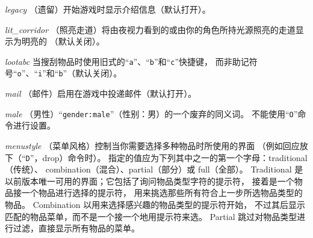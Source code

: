 \documentclass[a4paper, 10pt]{article}
\newcommand{\ib}[1]{\it #1 \hfill}
\begin{document}
\item[\ib{legacy}]
（遗留）开始游戏时显示介绍信息（默认打开）。
\item[\ib{lit\_corridor}]
（照亮走道）将由夜视力看到的或由你的角色所持光源照亮的走道显示为明亮的
（默认关闭）。
\item[\ib{lootabc}]
当搜刮物品时使用旧式的“{\tt a}”、“{\tt b}”和“{\tt c}”快捷键，
而非助记符号“{\tt o}”、“{\tt i}”和“{\tt b}”（默认关闭）。
\item[\ib{mail}]
（邮件）启用在游戏中投递邮件（默认打开）。
\item[\ib{male}]
（男性）“{\tt gender:male}”（性别：男）的一个废弃的同义词。
不能使用“{\tt O}”命令进行设置。
\item[\ib{menustyle}]
（菜单风格）控制当你需要选择多种物品时所使用的界面
（例如回应放下（“{\tt D}”，drop）命令时）。
指定的值应为下列其中之一的第一个字母：traditional（传统）、
combination（混合）、partial（部分）或 full（全部）。
Traditional 是以前版本唯一可用的界面；它包括了询问物品类型字符的提示符，
接着是一个物品接一个物品进行选择的提示符，
用来挑选那些所有符合上一步所选物品类型的物品。
Combination 以用来选择感兴趣的物品类型的提示符开始，
不过其后显示匹配的物品菜单，而不是一个接一个地用提示符来选。
Partial 跳过对物品类型进行过滤，直接显示所有物品的菜单。
\end{document}
